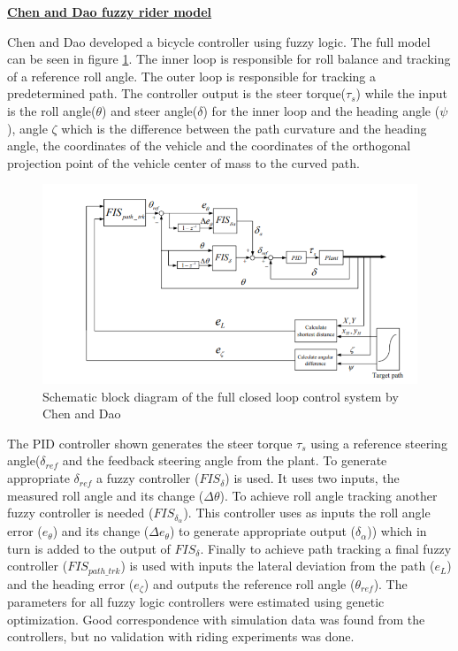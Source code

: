 \bigbreak
\underline{\textbf{Chen and Dao fuzzy rider model \cite{chen2005dynamics,chen2006fuzzy,chen2007genetic}}}
\newline
\par
Chen and Dao  developed a bicycle controller using  fuzzy logic. The full model can be seen in figure \ref{fig:figure13}. The inner loop is responsible for roll balance and tracking of a reference roll angle. The outer loop is responsible for tracking a predetermined path. The controller output is the steer torque(\ensuremath{\tau_s}) while the input is the roll angle(\ensuremath{\theta}) and steer angle(\ensuremath{\delta}) for the inner loop and the heading angle (\ensuremath{\psi}), angle \ensuremath{\zeta} which is the difference between the path curvature and the heading angle, the coordinates of the vehicle and the coordinates of the orthogonal projection point of the vehicle center of mass to the curved path.
\begin{figure}[ht]
    \centering
    \includegraphics[scale=0.65]{images/dao_fuzzy.png}
    \caption{ Schematic block diagram of the full closed loop control system by Chen and Dao\cite{chen2007genetic}}
    \label{fig:figure13}
\end{figure}
\par
The PID controller shown generates the steer torque \ensuremath{\tau_s} using a reference steering angle(\ensuremath{\delta_{ref}} and the feedback steering angle from the plant. To generate appropriate  \ensuremath{\delta_{ref}}  a fuzzy controller (\ensuremath{FIS_{\delta}}) is used. It uses two inputs, the measured roll angle and its change (\ensuremath{\Delta\theta}). To achieve roll angle tracking another fuzzy controller is needed (\ensuremath{FIS_{\delta_\alpha}}). This controller uses as inputs the roll angle error (\ensuremath{e_\theta}) and its change (\ensuremath{\Delta e_\theta}) to generate appropriate output (\ensuremath{\delta_\alpha})) which in turn is added to the output of \ensuremath{FIS_{\delta}}. Finally to achieve path tracking a final fuzzy controller (\ensuremath{FIS_{path\_trk}}) is used with inputs the lateral deviation from the path (\ensuremath{e_L}) and the heading error (\ensuremath{e_\zeta}) and outputs the reference roll angle (\ensuremath{\theta_{ref}}). The parameters for all fuzzy logic controllers were estimated using genetic optimization. Good correspondence with simulation data was found from the controllers, but no validation with riding experiments was done.

